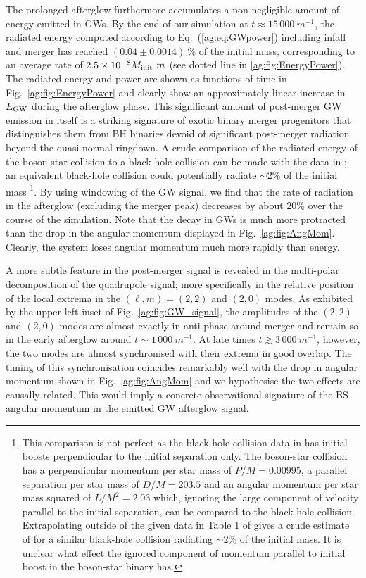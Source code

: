 The prolonged afterglow furthermore accumulates a non-negligible
amount of energy emitted in GWs. By the end of our simulation
at $t\approx 15\,000~m^{-1}$, the radiated energy computed
according to Eq.~(\ref{ag:eq:GWpower}) including
infall and merger has reached
$(0.04 \pm 0.0014)~\% $ of the initial mass,
corresponding to an average rate of $2.5 \times 10^{-8} M_{\rm init}~m$ (see dotted line in \ref{ag:fig:EnergyPower}).
The radiated energy and power are shown
as functions of time in Fig.~\ref{ag:fig:EnergyPower}
and clearly show an approximately linear increase in
$E_{\rm GW}$ during the afterglow phase.
This significant amount of post-merger GW emission in itself is a
striking signature of exotic binary merger progenitors
that distinguishes them from BH binaries devoid
of significant post-merger radiation beyond the quasi-normal ringdown.
A crude comparison of the radiated energy of the boson-star collision to a
black-hole collision can be made with the data in \cite{Sperhake:2007gu};
an equivalent black-hole collision could potentially radiate $\sim 2\%$ of the
initial mass
\footnote{
    This comparison is not perfect as the black-hole collision data in \cite{Sperhake:2007gu} has initial boosts perpendicular to the initial separation only.
    The boson-star collision has a
    perpendicular momentum per star mass of $P/M = 0.00995$, a parallel separation
    per star mass of $D/M = 203.5$ and an angular momentum per star mass squared
    of $L/M^2 = 2.03$ which, ignoring the large component of velocity parallel
    to the initial separation, can be compared to the black-hole collision.
    Extrapolating outside of the given data in Table 1 of \cite{Sperhake:2007gu} gives
    a crude estimate of for a similar black-hole collision radiating
    $\sim 2 \%$ of the initial mass.
    It is unclear what effect the ignored component of momentum parallel to
    initial boost in the boson-star binary has.
}.
By using windowing of the GW signal, we find that the rate of radiation in the afterglow (excluding the merger peak) decreases by about $20 \%$ over the course of the simulation.
Note that the decay in GWs is much more protracted than the drop in the angular momentum displayed in Fig.~\ref{ag:fig:AngMom}.
Clearly, the system loses angular momentum much more rapidly
than energy.


A more subtle feature in the post-merger signal is revealed in
the multi-polar decomposition of the quadrupole signal;
more specifically in the relative position of the local extrema
in the $(\ell,m)=(2,2)$ and $(2,0)$ modes. As exhibited by
the upper left inset of Fig.~\ref{ag:fig:GW_signal}, the amplitudes
of the $(2,2)$ and $(2,0)$ modes are almost exactly
in anti-phase around merger and remain so in the early afterglow
around $t\sim 1\,000~m^{-1}$. At late times
$t\gtrsim 3\,000~m^{-1}$, however, the
two modes are almost synchronised with their extrema
in good overlap.
The timing of this synchronisation coincides remarkably well
with the drop in angular momentum shown in Fig.~\ref{ag:fig:AngMom}
and we hypothesise the two effects are causally related.
This would imply a concrete observational signature of the
BS angular momentum in the emitted GW afterglow signal.


